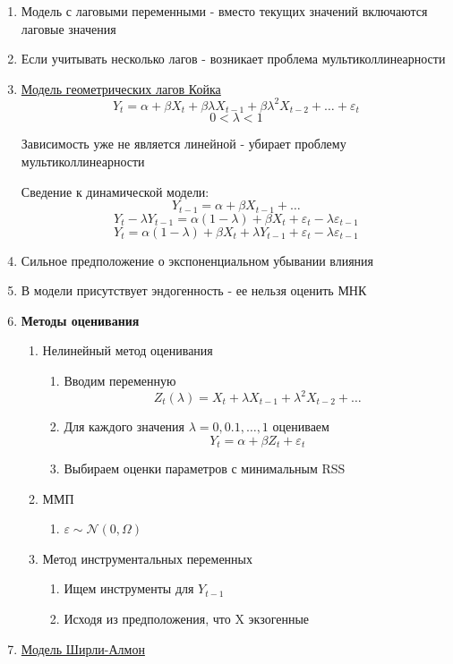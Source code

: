 \documentclass[a4paper, 12pt]{article}
\begin{document}
\begin{enumerate}
    \item Модель с лаговыми переменными - вместо текущих значений включаются лаговые значения
    \item Если учитывать несколько лагов - возникает проблема мультиколлинеарности
    \item \underline{Модель геометрических лагов Койка}
        \[Y_t = \alpha + \beta X_t + \beta \lambda X_{t - 1} + \beta \lambda^{2} X_{t - 2} + \ldots + \varepsilon_t\]
        \[0 < \lambda < 1\]

        Зависимость уже не является линейной - убирает проблему мультиколлинеарности

        Сведение к динамической модели:
        \[Y_{t - 1} = \alpha + \beta X_{t - 1} + \ldots\]
        \[Y_t - \lambda Y_{t - 1} = \alpha (1 - \lambda) + \beta X_t + \varepsilon_t - \lambda \varepsilon_{t-1}\]
        \[Y_t = \alpha (1 - \lambda) + \beta X_t + \lambda Y_{t - 1} + \varepsilon_t - \lambda \varepsilon_{t-1}\]

    \item Сильное предположение о экспоненциальном убывании влияния
    \item В модели присутствует эндогенность - ее нельзя оценить МНК
    \item \textbf{Методы оценивания}
    \begin{enumerate}
        \item Нелинейный метод оценивания
        \begin{enumerate}
            \item Вводим переменную
            \[Z_t(\lambda) = X_t + \lambda X_{t - 1} + \lambda^{2} X_{t - 2} + \ldots\]
            \item Для каждого значения $\lambda = 0, 0.1, \ldots, 1$ оцениваем
            \[Y_t = \alpha + \beta Z_t + \varepsilon_t\]
            \item Выбираем оценки параметров с минимальным RSS
        \end{enumerate}
        \item ММП
        \begin{enumerate}
            \item $\varepsilon \sim \mathcal{N}(0, \Omega)$
        \end{enumerate}
        \item Метод инструментальных переменных
        \begin{enumerate}
            \item Ищем инструменты для $Y_{t - 1}$
            \item Исходя из предположения, что X экзогенные
        \end{enumerate}
    \end{enumerate}
    \item \underline{Модель Ширли-Алмон}
    

\end{enumerate}
\end{document}
